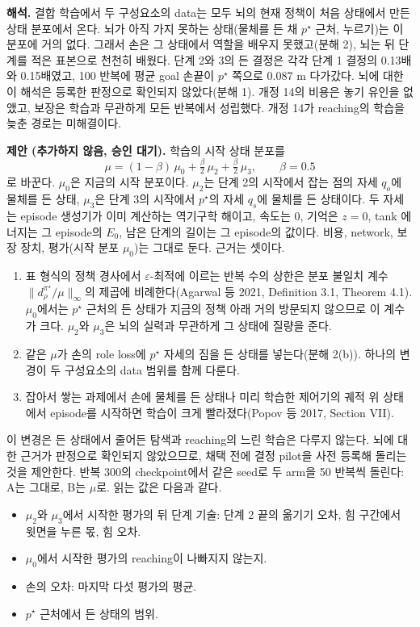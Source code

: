 \documentclass[11pt]{article}\usepackage[margin=1in]{geometry}\usepackage{amsmath,amssymb,amsthm,mathtools}\usepackage{graphicx}\graphicspath{{figures/}{../figures/}{figs/}{./}}\usepackage{enumitem}\usepackage{hyperref}\usepackage{cleveref}\usepackage{tikz}\usetikzlibrary{arrows.meta,positioning,calc,shapes.geometric}\usepackage{float}\usepackage{rotating}\usepackage[most]{tcolorbox}\usepackage{kotex}\usepackage{booktabs}\usepackage{longtable}\emergencystretch=1.6em\tolerance=2000 \crefname{assumption}{Assumption}{Assumptions}\Crefname{assumption}{Assumption}{Assumptions}\crefname{definition}{Definition}{Definitions}\Crefname{definition}{Definition}{Definitions}\crefname{proposition}{Proposition}{Propositions}\Crefname{proposition}{Proposition}{Propositions}\crefname{fact}{Fact}{Facts}\Crefname{fact}{Fact}{Facts} \newtheorem{assumption}{Assumption}\newtheorem{definition}{Definition}\newtheorem{lemma}{Lemma}\newtheorem{proposition}{Proposition}\newtheorem{theorem}{Theorem}\newtheorem{corollary}{Corollary}\newtheorem{fact}{Fact}\theoremstyle{remark}\newtheorem{remark}{Remark} \newcommand{\R}{\mathbb{R}}\newcommand{\xb}{\bar x}\newcommand{\Ab}{\bar A}\newcommand{\By}{\bar B_y}\newcommand{\U}{\mathcal U}\newcommand{\Z}{\mathcal Z}
\begin{document}
\textbf{해석.} 결합 학습에서 두 구성요소의 data는 모두 뇌의 현재 정책이 처음 상태에서 만든 상태 분포에서 온다. 뇌가 아직 가지 못하는 상태(물체를 든 채 $p^\star$ 근처, 누르기)는 이 분포에 거의 없다. 그래서 손은 그 상태에서 역할을 배우지 못했고(분해 2), 뇌는 뒤 단계를 적은 표본으로 천천히 배웠다. 단계 2와 3의 든 결정은 각각 단계 1 결정의 0.13배와 0.15배였고, 100 반복에 평균 goal 손끝이 $p^\star$ 쪽으로 0.087 m 다가갔다. 뇌에 대한 이 해석은 등록한 판정으로 확인되지 않았다(분해 1). 개정 14의 비용은 놓기 유인을 없앴고, 보장은 학습과 무관하게 모든 반복에서 성립했다. 개정 14가 reaching의 학습을 늦춘 경로는 미해결이다.

\textbf{제안 (추가하지 않음, 승인 대기).} 학습의 시작 상태 분포를
\[
\mu=(1-\beta)\,\mu_0+\tfrac{\beta}{2}\,\mu_2+\tfrac{\beta}{2}\,\mu_3,\qquad \beta=0.5
\]
로 바꾼다. $\mu_0$은 지금의 시작 분포이다. $\mu_2$는 단계 2의 시작에서 잡는 점의 자세 $q_o$에 물체를 든 상태, $\mu_3$은 단계 3의 시작에서 $p^\star$의 자세 $q_s$에 물체를 든 상태이다. 두 자세는 episode 생성기가 이미 계산하는 역기구학 해이고, 속도는 0, 기억은 $z=0$, tank 에너지는 그 episode의 $E_0$, 남은 단계의 길이는 그 episode의 값이다. 비용, network, 보장 장치, 평가(시작 분포 $\mu_0$)는 그대로 둔다. 근거는 셋이다.
\begin{enumerate}[label=(\roman*)]
\item 표 형식의 정책 경사에서 $\varepsilon$-최적에 이르는 반복 수의 상한은 분포 불일치 계수 $\|d^{\pi^\star}_\rho/\mu\|_\infty$의 제곱에 비례한다(Agarwal 등 2021, Definition 3.1, Theorem 4.1). $\mu_0$에서는 $p^\star$ 근처의 든 상태가 지금의 정책 아래 거의 방문되지 않으므로 이 계수가 크다. $\mu_2$와 $\mu_3$은 뇌의 실력과 무관하게 그 상태에 질량을 준다.
\item 같은 $\mu$가 손의 role loss에 $p^\star$ 자세의 짐을 든 상태를 넣는다(분해 2(b)). 하나의 변경이 두 구성요소의 data 범위를 함께 다룬다.
\item 잡아서 쌓는 과제에서 손에 물체를 든 상태나 미리 학습한 제어기의 궤적 위 상태에서 episode를 시작하면 학습이 크게 빨라졌다(Popov 등 2017, Section VII).
\end{enumerate}
이 변경은 든 상태에서 줄어든 탐색과 reaching의 느린 학습은 다루지 않는다. 뇌에 대한 근거가 판정으로 확인되지 않았으므로, 채택 전에 결정 pilot을 사전 등록해 돌리는 것을 제안한다. 반복 300의 checkpoint에서 같은 seed로 두 arm을 50 반복씩 돌린다: A는 그대로, B는 $\mu$로. 읽는 값은 다음과 같다.
\begin{itemize}
\item $\mu_2$와 $\mu_3$에서 시작한 평가의 뒤 단계 기술: 단계 2 끝의 옮기기 오차, 힘 구간에서 윗면을 누른 몫, 힘 오차.
\item $\mu_0$에서 시작한 평가의 reaching이 나빠지지 않는지.
\item 손의 오차: 마지막 다섯 평가의 평균.
\item $p^\star$ 근처에서 든 상태의 범위.
\end{itemize}
\end{document}

